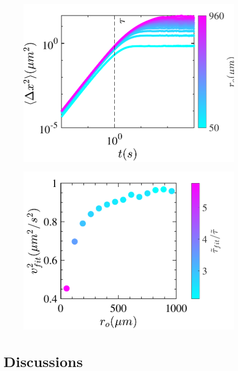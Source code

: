 \documentclass[%
10pt,
superscriptaddress,
twocolumn,
 amsmath,amssymb,
 aps,prx,
]{revtex4-2}
\begin{document}
\begin{figure}[h!]
        \centering
        \includegraphics[width=\columnwidth]{figures/MSD_ro.pdf}
        \caption{}
        \label{fig:MSD_different_ro}
\end{figure}
 \begin{figure}[h!]
        \includegraphics[width=\columnwidth]{figures/ro_v2fit_t2fit.pdf}
      \caption{}
      \label{fig:v2_ro}
  \end{figure}











\section{Discussions}
\end{document}
